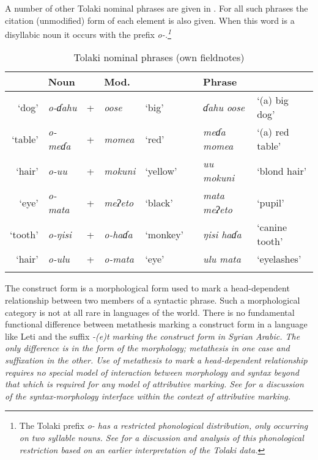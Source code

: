 \begin{exe}\let\eachwordone=\itshape
\end{exe}

A number of other Tolaki nominal phrases are given in .
For all such phrases the citation (unmodified) form of each element is also given.
When this word is a disyllabic noun it occurs with the prefix \it{o-}.\footnote{
		The Tolaki prefix \it{o-} has a restricted phonological distribution,
		only occurring on two syllable nouns.
		See \cite{be12} for a discussion and analysis of this phonological restriction
		based on an earlier interpretation of the Tolaki data.}

\begin{table}[ht]
	\caption[Tolaki nominal phrases]{Tolaki nominal phrases (own fieldnotes)}\label{tab:TolAttAdj}
	\centering
		\stl{0.4em}\begin{tabular}{rlcllcll}\lsptoprule
							&Noun						& &Mod.					&					&		&Phrase							&\\ \midrule
			`dog'		&\it{o-ɗahu}		&+&\it{o{\B}ose}&`big'		&\ra&\it{ɗahu o{\B}ose}	&`(a) big dog'\\
			`table'	&\it{o-meɗa}		&+&\it{momea}		&`red'		&\ra&\it{meɗa momea}		&`(a) red table'\\
			`hair'	&\it{o-{\B}uu}	&+&\it{mokuni}	&`yellow'	&\ra&\it{{\B}uu mokuni}	&`blond hair'\\
			`eye'		&\it{o-mata}		&+&\it{meʔeto}	&`black'	&\ra&\it{mata meʔeto}		&`pupil'\\
			`tooth'	&\it{o-ŋisi}		&+&\it{o-haɗa}	&`monkey'	&\ra&\it{ŋisi haɗa}			&`canine tooth'\\
			`hair'	&\it{o-{\B}ulu}	&+&\it{o-mata}	&`eye'		&\ra&\it{{\B}ulu mata}	&`eyelashes'\\ \lspbottomrule
		\end{tabular}
\end{table}

The construct form is a morphological form used to
mark a head-dependent relationship between
two members of a syntactic phrase.
Such a morphological category is not at all rare in languages of the world.
There is no fundamental functional difference between metathesis marking a
construct form in a language like Leti
and the suffix \it{-(e)t} marking the construct form in Syrian Arabic.
The only difference is in the form of the morphology;
metathesis in one case and suffixation in the other.
Use of metathesis to mark a head-dependent relationship requires
no special model of interaction between morphology and syntax
beyond that which is required for any model of attributive marking.
See \citet[15--22]{ri16} for a discussion of the syntax-morphology interface
within the context of attributive marking.


